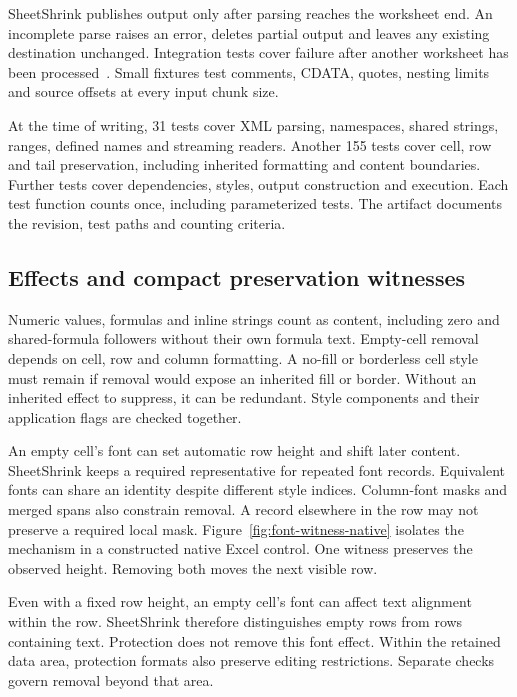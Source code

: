 SheetShrink publishes output only after parsing reaches the worksheet end. An
incomplete parse raises an error, deletes partial output and leaves any existing
destination unchanged. Integration tests cover failure after another worksheet has
been processed~\cite{incompleteparsefix}. Small fixtures test comments, CDATA,
quotes, nesting limits and source offsets at every input chunk size.

At the time of writing, 31 tests cover XML parsing, namespaces, shared strings,
ranges, defined names and streaming readers. Another 155 tests cover cell, row and
tail preservation, including inherited formatting and content boundaries. Further
tests cover dependencies, styles, output construction and execution. Each test
function counts once, including parameterized tests. The artifact documents the
revision, test paths and counting criteria.

\subsection{Effects and compact preservation witnesses}
Numeric values, formulas and inline strings count as content, including zero and
shared-formula followers without their own formula text. Empty-cell removal depends
on cell, row and column formatting. A no-fill or borderless cell style must remain
if removal would expose an inherited fill or border. Without an inherited effect
to suppress, it can be redundant. Style components and their application flags are
checked together.

An empty cell's font can set automatic row height and shift later content.
SheetShrink keeps a required representative for repeated font records. Equivalent
fonts can share an identity despite different style indices. Column-font masks
and merged spans also constrain removal. A record elsewhere in the row may not
preserve a required local mask.
Figure~\ref{fig:font-witness-native} isolates the mechanism in a constructed
native Excel control. One witness preserves the observed height. Removing both
moves the next visible row.


Even with a fixed row height, an empty cell's font can affect text alignment within
the row. SheetShrink therefore distinguishes empty rows from rows containing text.
Protection does not remove this font effect. Within the retained data area,
protection formats also preserve editing restrictions. Separate checks govern
removal beyond that area.

